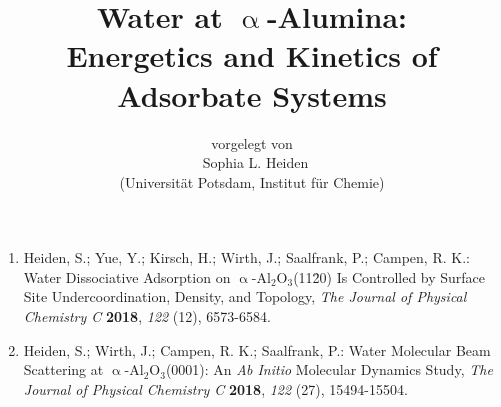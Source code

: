 \documentclass[11pt,DIV=13,a4paper,headinclude]{scrartcl}
\begin{document}
\titlehead{\centering\normalfont\large\scshape Publikationsliste zur Dissertation mit dem Titel}
\title{\Large\vspace{-\baselineskip} {\frqq}Water at $\upalpha$-Alumina:\\
  Energetics and Kinetics of Adsorbate Systems{\flqq}\vspace{0\baselineskip}}
\author{\large\sffamily vorgelegt von\\
  \Large\textbf\sffamily\ Sophia L. Heiden\\
  \large\sffamily (Universit\"{a}t Potsdam, Institut f\"{u}r Chemie)}
\date{}

\maketitle

\thispagestyle{empty}
\begin{enumerate}[itemsep=0.25\baselineskip]
  \item Heiden, S.; Yue, Y.; Kirsch, H.; Wirth, J.; Saalfrank, P.; Campen, R. K.: {\frqq}Water Dissociative Adsorption on $\upalpha$-Al$_2$O$_3$(11\=20) Is Controlled by Surface Site Undercoordination, Density, and Topology{\flqq}, \textit{The Journal of Physical Chemistry C} \textbf{2018}, \textit{122} (12), 6573-6584.
  \item Heiden, S.; Wirth, J.; Campen, R. K.; Saalfrank, P.: {\frqq}Water Molecular Beam Scattering at $\upalpha$-Al$_2$O$_3$(0001): An \textit{Ab Initio} Molecular Dynamics Study{\flqq}, \textit{The Journal of Physical Chemistry C} \textbf{2018}, \textit{122} (27), 15494-15504.

\end{enumerate}
\end{document}

